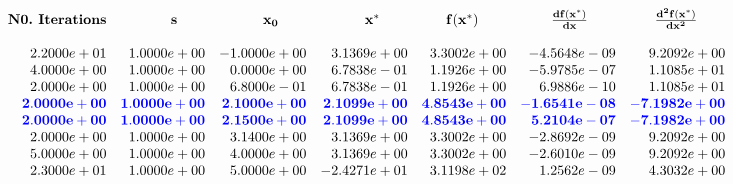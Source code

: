 \begin{equation}
\begin{array}{rrrrrrr}
\text{\bf N0.~Iterations} & \mathbf{s} \hspace*{7mm} & \mathbf{x_0} \hspace*{7mm}& \mathbf{x^\ast} \hspace*{7mm} & \mathbf{f(x^\ast)} \hspace*{7mm} & \mathbf{\frac{d f(x^\ast)}{dx}} \hspace*{7mm}
& \mathbf{\frac{d^2 f(x^\ast)}{dx^2}} \hspace*{7mm}\\
\\
2.2000e+01 & 1.0000e+00 & -1.0000e+00 & 3.1369e+00 & 3.3002e+00 & -4.5648e-09 & 9.2092e+00 \\
4.0000e+00 & 1.0000e+00 & 0.0000e+00 & 6.7838e-01 & 1.1926e+00 & -5.9785e-07 & 1.1085e+01 \\
2.0000e+00 & 1.0000e+00 & 6.8000e-01 & 6.7838e-01 & 1.1926e+00 & 6.9886e-10 & 1.1085e+01 \\
\color{blue} \bf 2.0000e+00 & \color{blue} \bf 1.0000e+00 & \color{blue} \bf 2.1000e+00 & \color{blue} \bf 2.1099e+00 & \color{blue} \bf 4.8543e+00 & \color{blue} \bf -1.6541e-08 & \color{blue} \bf -7.1982e+00 \\
\color{blue} \bf 2.0000e+00 & \color{blue} \bf 1.0000e+00 & \color{blue} \bf 2.1500e+00 & \color{blue} \bf 2.1099e+00 & \color{blue} \bf 4.8543e+00 & \color{blue} \bf 5.2104e-07 & \color{blue} \bf -7.1982e+00 \\
2.0000e+00 & 1.0000e+00 & 3.1400e+00 & 3.1369e+00 & 3.3002e+00 & -2.8692e-09 & 9.2092e+00 \\
5.0000e+00 & 1.0000e+00 & 4.0000e+00 & 3.1369e+00 & 3.3002e+00 & -2.6010e-09 & 9.2092e+00 \\
2.3000e+01 & 1.0000e+00 & 5.0000e+00 & -2.4271e+01 & 3.1198e+02 & 1.2562e-09 & 4.3032e+00 \\
\end{array}
\end{equation}


